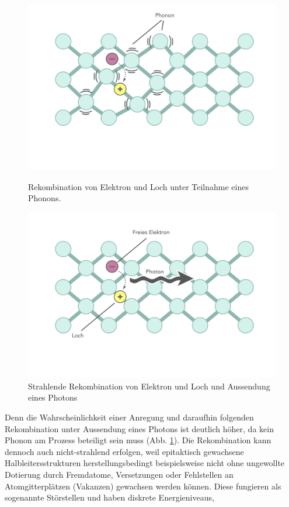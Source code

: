 \begin{figure}[htb]
    \centering
    \begin{minipage}[t]{0.49\linewidth}
        \centering
        \includegraphics[width=\linewidth]{Bilder/nonradRekomb.png}
        \caption{Rekombination von Elektron und Loch unter Teilnahme eines Phonons.}
				\label{fig:rekombphoton}
    \end{minipage}%
    \hfill
    \begin{minipage}[t]{0.49\linewidth}
        \centering
        \includegraphics[width=\linewidth]{Bilder/radRekomb.png}
        \caption{Strahlende Rekombination von Elektron und Loch und Aussendung eines Photons}
    \end{minipage}
\end{figure}
\noindent
Denn die Wahrscheinlichkeit einer Anregung und daraufhin folgenden Rekombination unter Aussendung eines Photons ist deutlich höher, da kein Phonon am Prozess beteiligt sein muss (Abb. \ref{fig:rekombphoton}). Die Rekombination kann dennoch auch nicht-strahlend erfolgen, weil epitaktisch gewachsene Halbleitersstrukturen herstellungsbedingt beispielsweise nicht ohne ungewollte Dotierung durch Fremdatome, Versetzungen oder Fehlstellen an Atomgitterplätzen (Vakanzen) gewachsen werden können. Diese fungieren als sogenannte Störstellen und haben diskrete Energieniveaus, 
